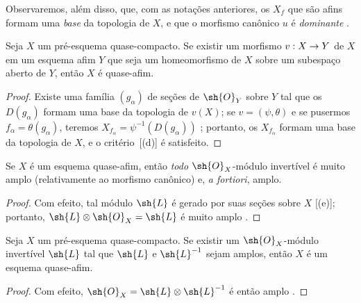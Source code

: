 \documentclass[oneside,10pt]{amsart}
\makeatletter
\newcommand{\ega@arrow}[2]{\mathchoice{#1}{#2}{#2}{#2}}
\renewcommand{\to}{\ega@arrow{\longrightarrow}{\rightarrow}}
\let\EGAOriginalLabel\label
\renewcommand{\label}[1]{\phantomsection\EGAOriginalLabel{#1}}
\makeatother
\begin{document}
Observaremos, além disso, que, com as notações anteriores, os $X_f$ que são afins formam uma \emph{base} da topologia de $X$, e que o morfismo canônico $u$ é \emph{dominante} .

\begin{corollary}[5.1.3]
\label{II.5.1.3}
Seja $X$ um pré-esquema quase-compacto.
Se existir um morfismo $v:X\to Y$ de $X$ em um esquema afim $Y$ que seja um homeomorfismo de $X$ sobre um subespaço aberto de $Y$, então $X$ é quase-afim.
\end{corollary}

\begin{proof}
Existe uma família $(g_\alpha)$ de seções de $\sh{O}_Y$ sobre $Y$ tal que os $D(g_\alpha)$ formam uma base da topologia de $v(X)$;
se $v=(\psi,\theta)$ e se pusermos $f_\alpha=\theta(g_\alpha)$, teremos $X_{f_\alpha}=\psi^{-1}(D(g_\alpha))$ ; portanto, os $X_{f_\alpha}$ formam uma base da topologia de $X$, e o critério~[(d)] é satisfeito.
\end{proof}

\begin{corollary}[5.1.4]
\label{II.5.1.4}
Se $X$ é um esquema quase-afim, então \emph{todo} $\sh{O}_X$-módulo invertível é muito amplo (relativamente ao morfismo canônico) e, \emph{a fortiori}, amplo.
\end{corollary}

\begin{proof}
Com efeito, tal módulo $\sh{L}$ é gerado por suas seções sobre $X$ [(e)]; portanto, $\sh{L}\otimes\sh{O}_X=\sh{L}$ é muito amplo .
\end{proof}

\begin{corollary}[5.1.5]
\label{II.5.1.5}
Seja $X$ um pré-esquema quase-compacto.
Se existir um $\sh{O}_X$-módulo invertível $\sh{L}$ tal que $\sh{L}$ e $\sh{L}^{-1}$ sejam amplos, então $X$ é um esquema quase-afim.
\end{corollary}

\begin{proof}
Com efeito, $\sh{O}_X=\sh{L}\otimes\sh{L}^{-1}$ é então amplo .
\end{proof}
\end{document}
